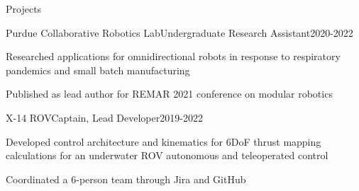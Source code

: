 \documentclass[]{jheidegger-resume}
\begin{document}
\begin{section}{Projects}
\begin{subsection_small}{Purdue Collaborative Robotics Lab}{Undergraduate Research Assistant}{2020-2022}
    \item{Researched applications for omnidirectional robots in response to respiratory pandemics and small batch manufacturing}
    \item {Published as lead author for REMAR 2021 conference on modular robotics}
\end{subsection_small}
\begin{subsection_small}{X-14 ROV}{Captain, Lead Developer}{2019-2022}
    \item{Developed control architecture and kinematics for 6DoF thrust mapping calculations for an underwater ROV autonomous and teleoperated control}
    \item{Coordinated a 6-person team through Jira and GitHub}
\end{subsection_small}

\end{section}
 {
}




\end{document}

